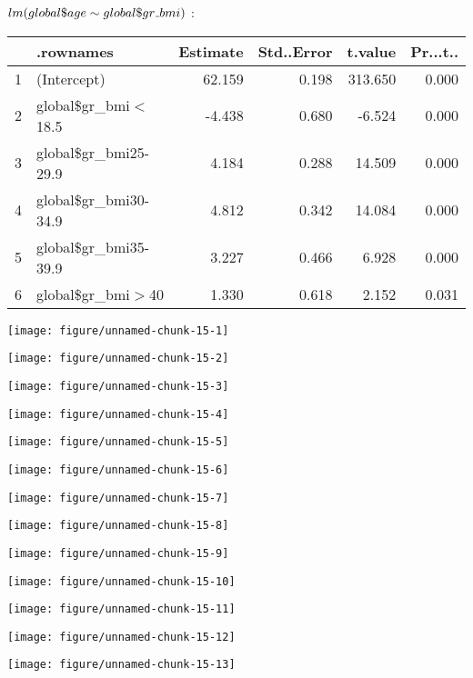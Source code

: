 \documentclass[11pt,a4paper]{article}\usepackage[]{graphicx}\usepackage[]{color}
\makeatletter
\def\maxwidth{ %
  \ifdim\Gin@nat@width>\linewidth
    \linewidth
  \else
    \Gin@nat@width
  \fi
}
\newenvironment{knitrout}{}{} %
\makeatother
\begin{document}
$lm(global\mathdollar age\sim global\mathdollar gr\mathunderscore bmi)$ :

\begin{table}[H]
\centering
\begin{tabular}{rlrrrr}
  \hline
 & .rownames & Estimate & Std..Error & t.value & Pr...t.. \\ 
  \hline
1 & (Intercept) & 62.159 & 0.198 & 313.650 & 0.000 \\ 
  2 & global\$gr\_bmi$<$18.5 & -4.438 & 0.680 & -6.524 & 0.000 \\ 
  3 & global\$gr\_bmi25-29.9 & 4.184 & 0.288 & 14.509 & 0.000 \\ 
  4 & global\$gr\_bmi30-34.9 & 4.812 & 0.342 & 14.084 & 0.000 \\ 
  5 & global\$gr\_bmi35-39.9 & 3.227 & 0.466 & 6.928 & 0.000 \\ 
  6 & global\$gr\_bmi$>$40 & 1.330 & 0.618 & 2.152 & 0.031 \\ 
   \hline
\end{tabular}
\end{table}


\begin{knitrout}
\color{fgcolor}
\texttt{[image: figure/unnamed-chunk-15-1]} 

\texttt{[image: figure/unnamed-chunk-15-2]} 

\texttt{[image: figure/unnamed-chunk-15-3]} 

\texttt{[image: figure/unnamed-chunk-15-4]} 

\texttt{[image: figure/unnamed-chunk-15-5]} 

\texttt{[image: figure/unnamed-chunk-15-6]} 

\texttt{[image: figure/unnamed-chunk-15-7]} 

\texttt{[image: figure/unnamed-chunk-15-8]} 

\texttt{[image: figure/unnamed-chunk-15-9]} 

\texttt{[image: figure/unnamed-chunk-15-10]} 

\texttt{[image: figure/unnamed-chunk-15-11]} 

\texttt{[image: figure/unnamed-chunk-15-12]} 

\texttt{[image: figure/unnamed-chunk-15-13]} 

\end{knitrout}
\end{document}
